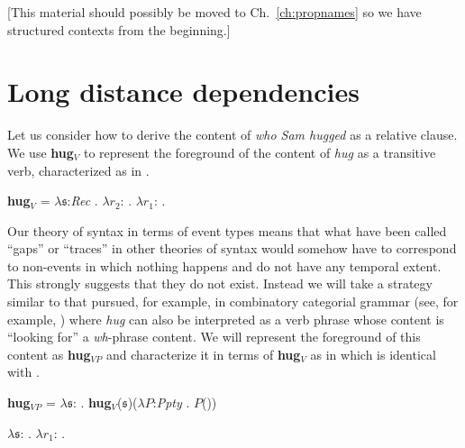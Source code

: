 [This material should possibly be moved to Ch.~\ref{ch:propnames} so we have
structured contexts from the beginning.]  


\section{Long distance dependencies}
\label{sec:long-distance}

Let us consider how to derive the content of \textit{who Sam hugged}
as a relative clause.  We use \textbf{hug}$_V$ to represent the
foreground of the content of \textit{hug} as a transitive verb,
characterized as in \nexteg{}.
\begin{ex} 
\textbf{hug}$_V$ = $\lambda\mathfrak{s}$:\textit{Rec} . $\lambda
r_2$: . $\lambda
r_1$:
.  
\end{ex} 
Our theory of syntax in terms of event types means that what have been
called ``gaps'' or ``traces'' in other theories of syntax would
somehow have to correspond to non-events in which nothing happens and
do not have any temporal extent.  This strongly suggests that they do
not exist.  Instead we will take a strategy similar to that pursued,
for example, in combinatory categorial grammar (see, for example,
\citealp{Steedman2012}) where \textit{hug} can also be interpreted as
a verb phrase whose content is ``looking for'' a \textit{wh}-phrase
content.  We will represent the foreground of this content as
\textbf{hug}$_{\mathit{VP}}$ and characterize it in terms of
\textbf{hug}$_V$ as in  which is identical with .
\begin{ex} 
\begin{subex}
\item \textbf{hug}$_{\mathit{VP}}$ = $\lambda\mathfrak{s}$:
. \textbf{hug}$_V$($\mathfrak{s}$)($\lambda P$:\textit{Ppty}
. $P$()) 

\item
  $\lambda\mathfrak{s}$:
  . $\lambda r_1$:
  . 
\end{subex}
\end{ex}

